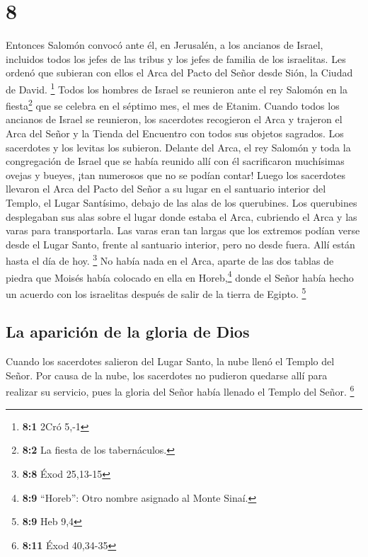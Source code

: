 \hypertarget{section-7}{%
\section{8}\label{section-7}}

 Entonces Salomón convocó ante él, en Jerusalén, a los
ancianos de Israel, incluidos todos los jefes de las tribus y los jefes
de familia de los israelitas. Les ordenó que subieran con ellos el Arca
del Pacto del Señor desde Sión, la Ciudad de David. \footnote{\textbf{8:1}
  2Cró 5,-1}  Todos los hombres de Israel se reunieron
ante el rey Salomón en la fiesta\footnote{\textbf{8:2} La fiesta de los
  tabernáculos.} que se celebra en el séptimo mes, el mes de Etanim.
 Cuando todos los ancianos de Israel se reunieron, los
sacerdotes recogieron el Arca y trajeron el Arca del Señor y la Tienda
del Encuentro con todos sus objetos sagrados.  Los
sacerdotes y los levitas los subieron.  Delante del Arca,
el rey Salomón y toda la congregación de Israel que se había reunido
allí con él sacrificaron muchísimas ovejas y bueyes, ¡tan numerosos que
no se podían contar!  Luego los sacerdotes llevaron el
Arca del Pacto del Señor a su lugar en el santuario interior del Templo,
el Lugar Santísimo, debajo de las alas de los querubines. 
Los querubines desplegaban sus alas sobre el lugar donde estaba el Arca,
cubriendo el Arca y las varas para transportarla.  Las
varas eran tan largas que los extremos podían verse desde el Lugar
Santo, frente al santuario interior, pero no desde fuera. Allí están
hasta el día de hoy. \footnote{\textbf{8:8} Éxod 25,13-15}
 No había nada en el Arca, aparte de las dos tablas de
piedra que Moisés había colocado en ella en Horeb,\footnote{\textbf{8:9}
  ``Horeb'': Otro nombre asignado al Monte Sinaí.} donde el Señor había
hecho un acuerdo con los israelitas después de salir de la tierra de
Egipto. \footnote{\textbf{8:9} Heb 9,4}

\hypertarget{la-apariciuxf3n-de-la-gloria-de-dios}{%
\subsection{La aparición de la gloria de
Dios}\label{la-apariciuxf3n-de-la-gloria-de-dios}}

 Cuando los sacerdotes salieron del Lugar Santo, la nube
llenó el Templo del Señor.  Por causa de la nube, los
sacerdotes no pudieron quedarse allí para realizar su servicio, pues la
gloria del Señor había llenado el Templo del Señor. \footnote{\textbf{8:11}
  Éxod 40,34-35}

